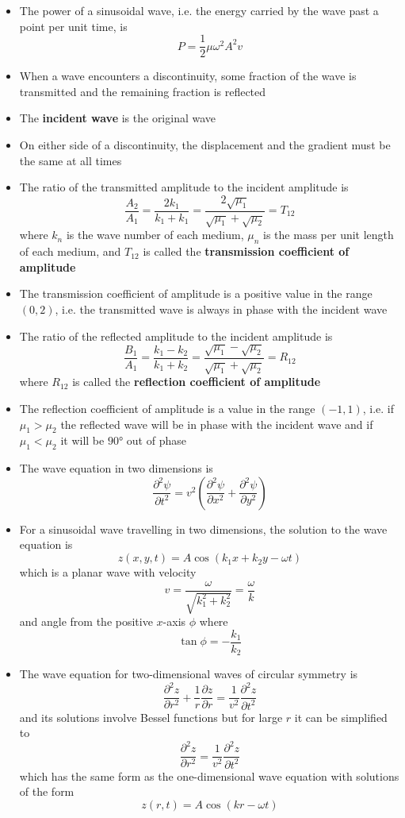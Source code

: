 \documentclass{article}
\begin{document}
\begin{itemize}
  \item The power of a sinusoidal wave, i.e. the energy carried by the wave past a point per unit time, is \[P = \frac{1}{2} \mu \omega^2 A^2 v\]

  \item When a wave encounters a discontinuity, some fraction of the wave is transmitted and the remaining fraction is reflected

  \item The \textbf{incident wave} is the original wave

  \item On either side of a discontinuity, the displacement and the gradient must be the same at all times

  \item The ratio of the transmitted amplitude to the incident amplitude is \[\frac{A_2}{A_1} = \frac{2 k_1}{k_1 + k_1} = \frac{2 \sqrt{\mu_1}}{\sqrt{\mu_1} + \sqrt{\mu_2}} = T_{12}\] where $k_n$ is the wave number of each medium, $\mu_n$ is the mass per unit length of each medium, and $T_{12}$ is called the \textbf{transmission coefficient of amplitude}

  \item The transmission coefficient of amplitude is a positive value in the range $(0, 2)$, i.e. the transmitted wave is always in phase with the incident wave

  \item The ratio of the reflected amplitude to the incident amplitude is \[\frac{B_1}{A_1} = \frac{k_1 - k_2}{k_1 + k_2} = \frac{\sqrt{\mu_1} - \sqrt{\mu_2}}{\sqrt{\mu_1} + \sqrt{\mu_2}} = R_{12}\] where $R_{12}$ is called the \textbf{reflection coefficient of amplitude}

  \item The reflection coefficient of amplitude is a value in the range $(-1, 1)$, i.e. if $\mu_1 > \mu_2$ the reflected wave will be in phase with the incident wave and if $\mu_1 < \mu_2$ it will be $\ang{90}$ out of phase

  \item The wave equation in two dimensions is \[\frac{\partial^2 \psi}{\partial t^2} = v^2 \left( \frac{\partial^2 \psi}{\partial x^2} + \frac{\partial^2 \psi}{\partial y^2} \right)\]

  \item For a sinusoidal wave travelling in two dimensions, the solution to the wave equation is \[z(x, y, t) = A \cos (k_1 x + k_2 y - \omega t)\] which is a planar wave with velocity \[v = \frac{\omega}{\sqrt{k_1^2 + k_2^2}} = \frac{\omega}{k}\] and angle from the positive $x$-axis $\phi$ where \[\tan \phi = -\frac{k_1}{k_2}\]

  \item The wave equation for two-dimensional waves of circular symmetry is \[\frac{\partial^2 z}{\partial r^2} + \frac{1}{r} \frac{\partial z}{\partial r} = \frac{1}{v^2} \frac{\partial^2 z}{\partial t^2}\] and its solutions involve Bessel functions but for large $r$ it can be simplified to \[\frac{\partial^2 z}{\partial r^2} = \frac{1}{v^2} \frac{\partial^2 z}{\partial t^2}\] which has the same form as the one-dimensional wave equation with solutions of the form \[z(r, t) = A \cos (k r - \omega t)\]
\end{itemize}
\end{document}
